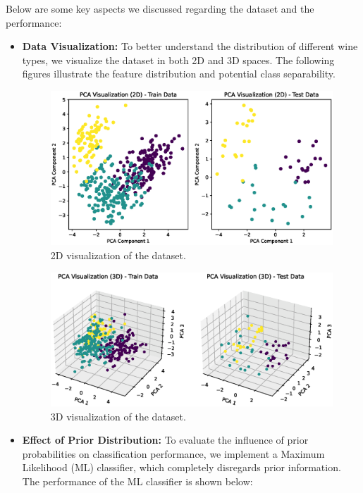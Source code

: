 Below are some key aspects we discussed regarding the dataset and the performance:
\begin{itemize}
    \item \textbf{Data Visualization:}  
    To better understand the distribution of different wine types, we visualize 
    the dataset in both 2D and 3D spaces. The following figures illustrate the 
    feature distribution and potential class separability.
    \begin{figure}[H]
        \centering
        \includegraphics[scale=0.7]{2D_visualize.eps}
        \caption{2D visualization of the dataset.}
        \label{fig:2d_visual}
    \end{figure}
    \begin{figure}[H]
        \centering
        \includegraphics[scale=0.7]{3D_visualize.eps}
        \caption{3D visualization of the dataset.}
        \label{fig:3d_visual}
    \end{figure}
    
    \item \textbf{Effect of Prior Distribution:}  
    To evaluate the influence of prior probabilities on classification performance, 
    we implement a Maximum Likelihood (ML) classifier, which completely disregards 
    prior information. The performance of the ML classifier is shown below:


\end{itemize}
